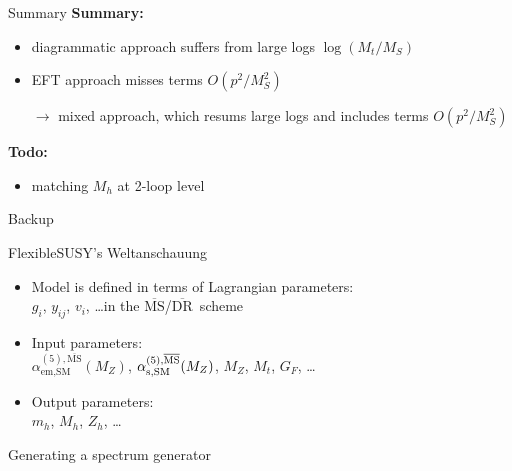 \documentclass[hyperref={pdfpagelabels=false},ngerman]{beamer}
\newcommand{\Lagr}{\mathcal{L}}
\renewcommand{\emph}{\textbf}
\newcommand{\DRbar}{\ensuremath{\overline{\text{DR}}}}
\newcommand{\MSbar}{\ensuremath{\overline{\text{MS}}}}
\begin{document}
\begin{frame}{Summary}
  \emph{Summary:}
  \begin{itemize}
  \item diagrammatic approach suffers from large logs $\log(M_t/M_S)$
  \item EFT approach misses terms $O(p^2/M_S^2)$
  \item[$\rightarrow$] mixed approach, which resums large logs and
    includes terms $O(p^2/M_S^2)$
  \end{itemize}
  \emph{Todo:}
  \begin{itemize}
  \item matching $M_h$ at 2-loop level
  \end{itemize}
\end{frame}


\begin{frame}[noframenumbering]
  \begin{center}
    \Huge Backup
  \end{center}
\end{frame}

\begin{frame}[noframenumbering]{FlexibleSUSY's Weltanschauung}
  \begin{itemize} \setlength\itemsep{2em}
  \item Model is defined in terms of Lagrangian parameters:\\
    $g_i$, $y_{ij}$, $v_i$, \ldots in the \MSbar/\DRbar\ scheme
  \item Input parameters:\\
    $\alpha_{\text{em},\text{SM}}^{(5),\MSbar}(M_Z)$,
    $\alpha_{\text{s},\text{SM}}^{(5),\text{\MSbar}}(M_Z)$, $M_Z$,
    $M_t$, $G_F$, \ldots
  \item Output parameters:\\ $m_h$, $M_h$, $Z_h$, \ldots
  \end{itemize}
\end{frame}

\begin{frame}[noframenumbering]{Generating a spectrum generator}
  \begin{figure}
    \centering
  \end{figure}
\end{frame}
\end{document}
